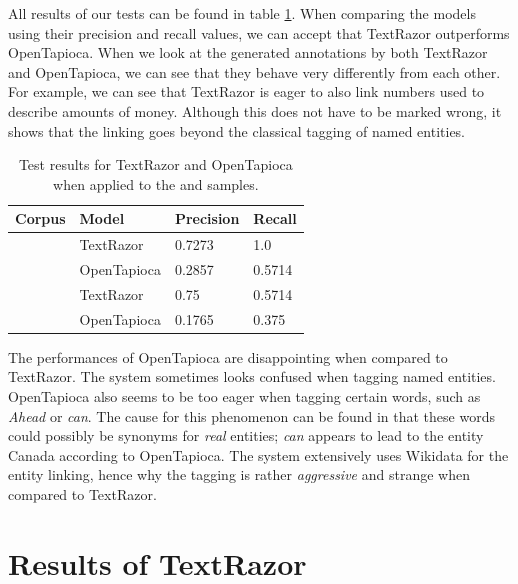 \documentclass[a4paper, 11pt]{article}
\begin{document}
All results of our tests can be found in table \ref{tab:results}. When comparing the models using their precision and recall values, we can accept that TextRazor outperforms OpenTapioca. When we look at the generated annotations by both TextRazor and OpenTapioca, we can see that they behave very differently from each other. For example, we can see that TextRazor is eager to also link numbers used to describe amounts of money. Although this does not have to be marked wrong, it shows that the linking goes beyond the classical tagging of named entities.

\begin{table}[h]
	\centering
	\begin{tabular}{llll}
	\textbf{Corpus}	& \textbf{Model} & \textbf{Precision} & \textbf{Recall} \\ \hline
	\citet{mcgee_2020}	& TextRazor & 0.7273 & 1.0  \\
	\citet{mcgee_2020}	& OpenTapioca & 0.2857 &  0.5714 \\
	\citet{mckeever_2020}	& TextRazor & 0.75 & 0.5714    \\
	\citet{mckeever_2020}	& OpenTapioca & 0.1765 & 0.375  \\
	\end{tabular}
	\caption{Test results for TextRazor and OpenTapioca when applied to the \citet{mcgee_2020} and \citet{mckeever_2020} samples.}
	\label{tab:results}
\end{table}

The performances of OpenTapioca are disappointing when compared to TextRazor. The system sometimes looks confused when tagging named entities. OpenTapioca also seems to be too eager when tagging certain words, such as \textit{Ahead} or \textit{can}. The cause for this phenomenon can be found in that these words could possibly be synonyms for \textit{real} entities; \textit{can} appears to lead to the entity Canada according to OpenTapioca. The system extensively uses Wikidata for the entity linking, hence why the tagging is rather \textit{aggressive} and strange when compared to TextRazor.




\newpage

\appendix

\section{Results of TextRazor}
\end{document}
